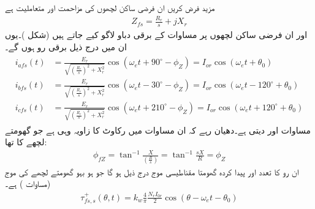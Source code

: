 مزید فرض کریں ان فرضی ساکن لچھوں کی مزاحمت   اور متعاملیت   ہے
\begin{align}
Z_{fs}=\frac{R_r}{s}+j X_r
\end{align}
اور ان فرضی ساکن لچھوں پر مساوات   کے برقی دباو لاگو کیے جاتے ہیں (شکل )۔یوں  ان میں درج ذیل برقی رو ہوں گے۔
\begin{gather}
\begin{aligned}
i_{afs}(t)&=\frac{E_r}{\sqrt{\left(\frac{R_r}{s} \right)^2+X_r^2}} \cos \left(\omega_e t+90^{\circ} -\phi_Z  \right)=I_{or} \cos \left(\omega_e t+\theta_0 \right)\\
i_{bfs}(t)&=\frac{E_r}{\sqrt{\left(\frac{R_r}{s} \right)^2+X_r^2}} \cos \left(\omega_e t-30^{\circ} -\phi_Z  \right)=I_{or}\cos \left(\omega_e t-120^{\circ} +\theta_0 \right)\\
i_{cfs}(t)&=\frac{E_r}{\sqrt{\left(\frac{R_r}{s} \right)^2+X_r^2}} \cos \left(\omega_e t+210^{\circ} -\phi_Z  \right)=I_{or} \cos \left(\omega_e t+120^{\circ}+\theta_0 \right)
\end{aligned}
\end{gather}
مساوات    اور  دیتی ہے۔دھیان رہے کہ ان مساوات میں  رکاوٹ کا زاویہ   وہی ہے جو گھومتے لچھے کا تھا:
\begin{align}
\phi_{fZ}=\tan^{-1} \frac{X}{\left(\frac{R}{s} \right)}=\tan^{-1} \frac{s X}{R}=\phi_Z
\end{align}
ان  رو کا تعدد  اور پیدا کردہ گھومتا مقناطیسی موج درج ذیل ہو گا جو ہو بہو گھومتے لچھے کی موج  (مساوات ) ہے۔
\begin{align}
\tau_{fs,s}^+(\theta,t)=k_w \frac{4}{\pi}\frac{N_r I_{0r}}{2} \cos (\theta-\omega_e t-\theta_0)
\end{align}

